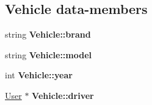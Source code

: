 \subsection*{Vehicle data-\/members}
\begin{DoxyCompactItemize}
\item 
\mbox{\label{group___vehicle_ga64ce936b4a102f38f34abb809caa5f09}} 
string {\bfseries Vehicle\+::brand}
\item 
\mbox{\label{group___vehicle_ga61799a3b07bd7ad2a07d61af510f91f0}} 
string {\bfseries Vehicle\+::model}
\item 
\mbox{\label{group___vehicle_gad612fe1e00e266a5d740bb67920211d4}} 
int {\bfseries Vehicle\+::year}
\item 
\mbox{\label{group___vehicle_ga69e17e185432f5514c3e9e20e000a678}} 
\hyperlink{class_user}{User} $\ast$ {\bfseries Vehicle\+::driver}
\end{DoxyCompactItemize}
